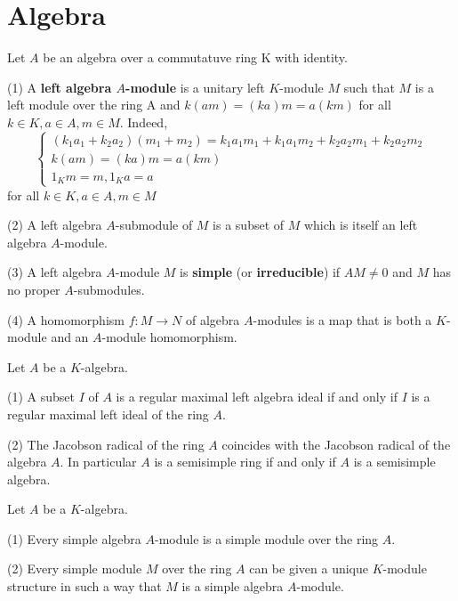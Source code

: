 \section{Algebra}
\begin{definition}
    Let $A$ be an algebra over a commutatuve ring K with identity.

    (1) A \textbf{left algebra $A$-module} is a unitary left $K$-module $M$ such that $M$ is a left module over the ring A and $k(am)=(ka) m=a(km )$ for all $k \in K, a \in A, m \in M$.
    Indeed,
    \begin{equation*}
        \begin{cases*}
            \left(k_1a_1+k_2a_2\right)\left(m_1+m_2\right)
            =
            k_1a_1m_1+k_1a_1m_2+k_2a_2m_1+k_2a_2m_2 \\
            k(am)=(ka) m=a(km)                      \\
            1_K m=m ,1_K a=a
        \end{cases*}
    \end{equation*}
    for all $k \in K, a \in A, m \in M$

    (2) A left algebra $A$-submodule of $M$ is a subset of $M$ which is itself an left algebra $A$-module.

    (3) A left algebra $A$-module $M$ is \textbf{simple} (or \textbf{irreducible}) if $AM\neq 0$ and $M$ has no proper $A$-submodules.

    (4) A homomorphism $f: M \rightarrow N$ of algebra $A$-modules is a map that is both a $K$-module and an $A$-module homomorphism.
\end{definition}

\begin{theorem}
    Let $A$ be a $K$-algebra.

    (1)
    A subset $I$ of $A$ is a regular maximal left algebra ideal if and only if $I$ is a regular maximal left ideal of the ring $A$.

    (2)
    The Jacobson radical of the ring $A$ coincides with the Jacobson radical of the algebra $A$.
    In particular $A$ is a semisimple ring if and only if $A$ is a semisimple algebra.
\end{theorem}



\begin{theorem}
    Let $A$ be a $K$-algebra.

    (1)
    Every simple algebra $A$-module is a simple module over the ring $A$.

    (2)
    Every simple module $M$ over the ring $A$ can be given a unique $K$-module structure in such a way that $M$ is a simple algebra $A$-module.
\end{theorem}


